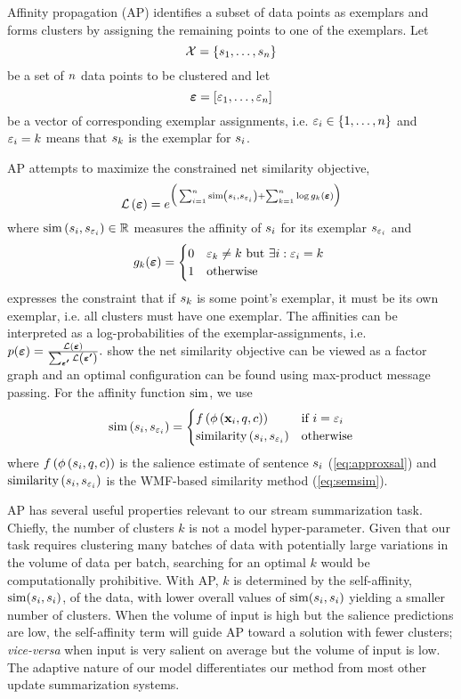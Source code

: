 Affinity propagation (AP)  identifies a subset of data points as exemplars and
forms clusters by assigning the remaining points to one of the exemplars.  Let
\[
    \mathcal{X} = \left\{s_1,\ldots,s_{n} \right\}
\]
be a set of $n$ data points to be clustered and let 
\[
    \boldsymbol{\varepsilon} = \left[\varepsilon_1,\ldots,\varepsilon_{n} \right]
\]
be a vector of corresponding exemplar assignments, i.e.  $\varepsilon_i \in
\{1,\ldots,n\}$ and $\varepsilon_i = k$ means that $s_k$ is the
exemplar for $s_i$.

AP attempts to maximize the constrained net similarity objective,
\[ \mathcal{L}\left(\boldsymbol{\varepsilon}\right) = e^{\Big(
    \sum_{i=1}^{n} \operatorname{sim}\left(s_i,s_{\varepsilon_i}\right) 
    + \sum_{k=1}^{n} \log g_k(\boldsymbol{\varepsilon}) 
\Big)}
\]
where $\operatorname{sim}\left(s_i, s_{\varepsilon_i}\right) \in \mathbb{R}$ measures
the affinity of $s_i$ for its exemplar $s_{\varepsilon_i}$ and 
\[
    g_k(\boldsymbol{\varepsilon}) = \begin{cases} 
    0 & \textrm{$\varepsilon_k \ne k$ but $\exists i: \varepsilon_i = k$ } \\ 
    1 & \textrm{otherwise}      \end{cases}
\] 
expresses the constraint that if $s_k$ is some point's exemplar, it must
be its own exemplar, i.e. all clusters must have one exemplar. The affinities
can be interpreted as a log-probabilities of the exemplar-assignments, i.e.
$p(\boldsymbol{\varepsilon}) = \frac{\mathcal{L}\left(\boldsymbol{\varepsilon}\right)}{ \sum_{\boldsymbol{\boldsymbol{\varepsilon}^\prime }
} \mathcal{L}\left(\boldsymbol{\boldsymbol{\varepsilon}^\prime }\right) }.$ \cite{frey2007} show the net
similarity objective can be viewed as a factor graph and an optimal
configuration can be found using max-product message passing.  For the affinity
function $\operatorname{sim}$, we use
\[ 
    \operatorname{sim}\left(s_i, s_{\varepsilon_i}\right) = \begin{cases}
        f\left(\phi\left(\mathbf{x}_i,q,c\right)\right) & 
            \textrm{if $i = \varepsilon_i$ }\\
         \operatorname{similarity}\left(s_i,s_{\varepsilon_i}\right) & \textrm{otherwise}
\end{cases}
\]
where $f\left(\phi\left(s_i,q,c\right)\right)$ is the salience estimate of
sentence $s_i$ (\autoref{eq:approxsal}) and $\operatorname{similarity}\left(s_i,
s_{\varepsilon_i}\right)$ is the WMF-based similarity method
(\autoref{eq:semsim}).

AP has several useful properties relevant to our stream summarization task.
Chiefly, the number of clusters $k$ is not a model hyper-parameter. Given that
our task requires clustering many batches of data with potentially large
variations in the volume of data per batch, searching for an optimal $k$ would
be computationally prohibitive. With AP, $k$ is determined by the
self-affinity, $\operatorname{sim}(s_i,s_i)$, of the data,  with lower overall
values of $\operatorname{sim}(s_i,s_i)$ yielding a smaller number of clusters.
When the volume of input is high but the salience predictions are low, the
self-affinity term will guide AP toward a solution with fewer clusters;
\textit{vice-versa} when input is very salient on average but the volume of
input is low. The adaptive nature of our model differentiates our method from
most other update summarization systems.

